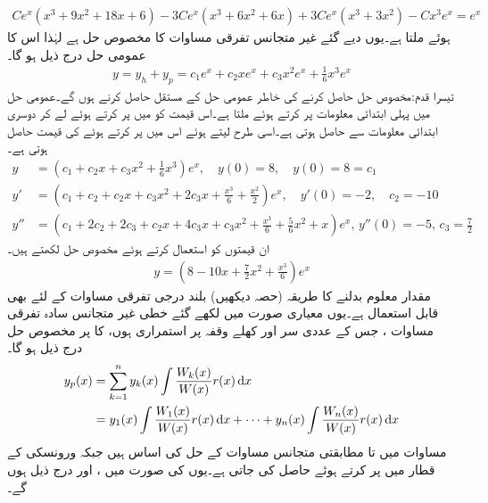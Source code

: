 \begin{align*}
Ce^x(x^3+9x^2+18x+6)-3Ce^x(x^3+6x^2+6x)+3Ce^x(x^3+3x^2)-Cx^3e^x=e^{x}
\end{align*}
ہوئے  ملتا ہے۔یوں دیے گئے غیر متجانس تفرقی مساوات کا مخصوص حل  ہے لہٰذا اس کا عمومی حل درج ذیل ہو گا۔
\begin{align*}
y=y_h+y_p=c_1e^x+c_2xe^x+c_3x^2e^x+\frac{1}{6}x^3e^x
\end{align*}
تیسرا قدم:\quad مخصوص حل حاصل کرنے کی خاطر عمومی حل کے مستقل حاصل کرنے ہوں گے۔عمومی حل میں پہلی ابتدائی معلومات  پر کرتے ہوئے  ملتا ہے۔اس قیمت کو  میں پر کرتے ہوئے  لے کر دوسری ابتدائی معلومات  سے  حاصل ہوتی ہے۔اسی طرح  لیتے ہوئے اس میں  پر کرتے ہوئے  کی قیمت حاصل ہوتی ہے۔
\begin{align*}
y&=(c_1+c_2x+c_3x^2+\frac{1}{6}x^3)e^x, \quad y(0)=8, \quad y(0)=8=c_1\\
y'&=(c_1+c_2+c_2x+c_3x^2+2c_3x+\frac{x^3}{6}+\frac{x^2}{2})e^x, \quad y'(0)=-2, \quad c_2=-10\\
y''&=(c_1+2c_2+2c_3+c_2x+4c_3x+c_3x^2+\frac{x^3}{6}+\frac{5}{6}x^2+x)e^x,\,y''(0)=-5, \, c_3=\frac{7}{2}
\end{align*} 
ان قیمتوں کو استعمال کرتے ہوئے مخصوص حل لکھتے ہیں۔
\begin{align*}
y=\left(8-10x+\frac{7}{2}x^2+\frac{x^3}{6}\right)e^x
\end{align*}
مقدار معلوم بدلنے کا طریقہ (حصہ  دیکھیں) بلند درجی تفرقی مساوات  کے لئے بھی قابل استعمال ہے۔یوں معیاری صورت میں لکھے گئے خطی غیر متجانس سادہ تفرقی مساوات  ، جس کے عددی سر اور  کھلے وقفہ  پر استمراری ہوں، کا   پر مخصوص حل  درج ذیل ہو گا۔
\begin{gather}
\begin{aligned}\label{مساوات_سادہ_بلند_متعین_متغیرات_بدلنے_الف}
y_p(x)&=\sum_{k=1}^{n} y_k(x)\int \frac{W_k(x)}{W(x)} r(x)\dif x\\
&=y_1(x)\int \frac{W_1(x)}{W(x)}r(x)\dif x+\cdots+y_n(x)\int \frac{W_n(x)}{W(x)}r(x)\dif x
\end{aligned}
\end{gather}
مساوات  میں  تا  مطابقتی متجانس مساوات  کے حل کی اساس ہیں جبکہ ورونسکی  کے  قطار میں  پر کرتے ہوئے  حاصل کی جاتی ہے۔یوں  کی صورت میں ،  اور  درج ذیل ہوں گے۔
